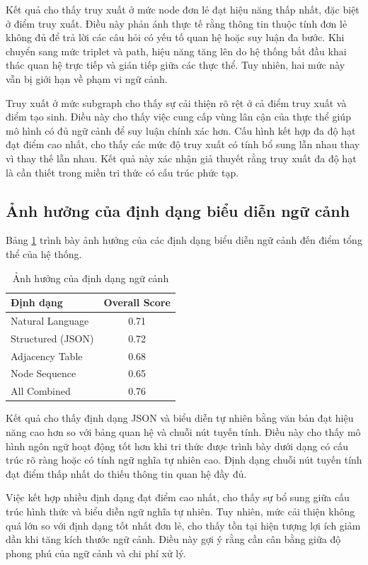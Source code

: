 Kết quả cho thấy truy xuất ở mức node đơn lẻ đạt hiệu năng thấp nhất, đặc biệt ở điểm truy xuất. Điều này phản ánh thực tế rằng thông tin thuộc tính đơn lẻ không đủ để trả lời các câu hỏi có yếu tố quan hệ hoặc suy luận đa bước. Khi chuyển sang mức triplet và path, hiệu năng tăng lên do hệ thống bắt đầu khai thác quan hệ trực tiếp và gián tiếp giữa các thực thể. Tuy nhiên, hai mức này vẫn bị giới hạn về phạm vi ngữ cảnh.

Truy xuất ở mức subgraph cho thấy sự cải thiện rõ rệt ở cả điểm truy xuất và điểm tạo sinh. Điều này cho thấy việc cung cấp vùng lân cận của thực thể giúp mô hình có đủ ngữ cảnh để suy luận chính xác hơn. Cấu hình kết hợp đa độ hạt đạt điểm cao nhất, cho thấy các mức độ truy xuất có tính bổ sung lẫn nhau thay vì thay thế lẫn nhau. Kết quả này xác nhận giả thuyết rằng truy xuất đa độ hạt là cần thiết trong miền tri thức có cấu trúc phức tạp.

\subsection{Ảnh hưởng của định dạng biểu diễn ngữ cảnh}

Bảng \ref{tab:format_results} trình bày ảnh hưởng của các định dạng biểu diễn ngữ cảnh đến điểm tổng thể của hệ thống.

\begin{table}[h]
\centering
\caption{Ảnh hưởng của định dạng ngữ cảnh}
\label{tab:format_results}
\begin{tabular}{lc}
\hline
\textbf{Định dạng} & \textbf{Overall Score} \\
\hline
Natural Language & 0.71 \\
Structured (JSON) & 0.72 \\
Adjacency Table & 0.68 \\
Node Sequence & 0.65 \\
All Combined & 0.76 \\
\hline
\end{tabular}
\end{table}

Kết quả cho thấy định dạng JSON và biểu diễn tự nhiên bằng văn bản đạt hiệu năng cao hơn so với bảng quan hệ và chuỗi nút tuyến tính. Điều này cho thấy mô hình ngôn ngữ hoạt động tốt hơn khi tri thức được trình bày dưới dạng có cấu trúc rõ ràng hoặc có tính ngữ nghĩa tự nhiên cao. Định dạng chuỗi nút tuyến tính đạt điểm thấp nhất do thiếu thông tin quan hệ đầy đủ.

Việc kết hợp nhiều định dạng đạt điểm cao nhất, cho thấy sự bổ sung giữa cấu trúc hình thức và biểu diễn ngữ nghĩa tự nhiên. Tuy nhiên, mức cải thiện không quá lớn so với định dạng tốt nhất đơn lẻ, cho thấy tồn tại hiện tượng lợi ích giảm dần khi tăng kích thước ngữ cảnh. Điều này gợi ý rằng cần cân bằng giữa độ phong phú của ngữ cảnh và chi phí xử lý.

